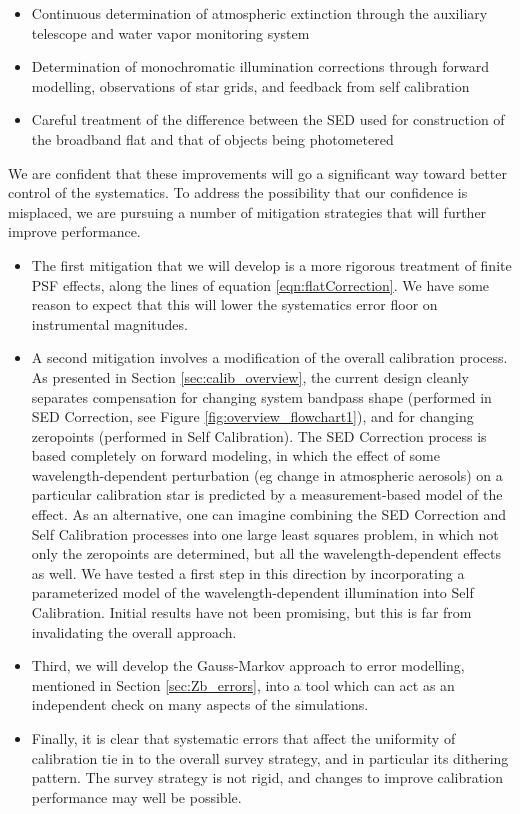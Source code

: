 \documentclass[12pt,preprint]{aastex}
\begin{document}
\begin{itemize}
\item{Continuous determination of atmospheric extinction through the auxiliary telescope and water
vapor monitoring system}
\item{Determination of monochromatic illumination corrections through forward modelling, observations of
star grids, and feedback from self calibration}
\item{Careful treatment of the difference between the SED used for construction of the broadband flat and 
that of objects being photometered}
\end{itemize}

We are confident that these improvements will go a significant way toward better control of the systematics.  
To address the possibility
that our confidence is misplaced, we are pursuing a number of mitigation strategies that will 
further improve performance.

\begin{itemize}
\item{The first mitigation that we will develop is a more rigorous treatment of finite PSF effects, 
along the lines of equation \ref{eqn:flatCorrection}.  We have some reason to expect that this will lower the
systematics error floor on instrumental magnitudes.}

\item{A second mitigation involves a modification of the overall calibration process.  
As presented in Section \ref{sec:calib_overview}, the current design cleanly separates compensation for changing system
bandpass shape (performed in SED Correction, see Figure \ref{fig:overview_flowchart1}), and for changing zeropoints
(performed in Self Calibration).  The SED Correction process is based completely on forward modeling,
in which the effect of some wavelength-dependent perturbation (eg change in atmospheric aerosols) on
a particular calibration star is predicted by a measurement-based model of the effect.  As
an alternative, one can imagine combining the SED Correction and Self Calibration processes into one
large least squares problem, in which not only the zeropoints are determined, but all the 
wavelength-dependent effects as well.  We have tested a first step in this direction by incorporating
a parameterized model of the wavelength-dependent illumination into Self Calibration.  Initial 
results have not been promising, but this is far from invalidating the overall approach.}

\item{Third, we will develop the Gauss-Markov approach to error modelling, mentioned in Section \ref{sec:Zb_errors},
into a tool which can act as an independent check on many aspects of the simulations.}

\item{Finally, it is clear that systematic errors that affect the uniformity of calibration tie in to the overall
survey strategy, and in particular its dithering pattern.  The survey strategy is not rigid, and changes
to improve calibration performance may well be possible.}

\end{itemize}
\end{document}
